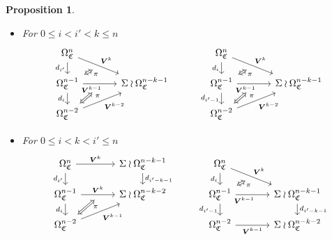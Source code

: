 \documentclass[a4paper,10pt
]{article}%
\numberwithin{equation}{section}
\numberwithin{figure}{section}
\newtheorem{proposition}[equation]{Proposition}%
\theoremstyle{definition} %
\newcommand{\1}{\ensuremath{\mathbbm 1}}%
\begin{document}
\begin{proposition}
\begin{itemize}
		\item[(FF1)]
		For $0 \leq i < i' < k \leq n$
		\begin{equation}
		\begin{tikzcd}[row sep = 12pt, column sep = 35pt]
		\Omega^n_{\mathfrak{C}}
		\arrow{dr}[swap,name=U]{}{\boldsymbol{V}^k} \arrow{d}[swap]{d_{i'}} &
		&
		\Omega^n_{\mathfrak{C}}
		\arrow{dr}[swap,name=UUU]{}{\boldsymbol{V}^k} \arrow{d}[swap]{d_i} &
		\\
		|[alias=V]|
		\Omega^{n-1}_{\mathfrak{C}} \ar{r}[near start,swap]{\boldsymbol{V}^{k-1}}[swap,name=UU]{} \arrow{d}[swap]{d_i}&
		\Sigma \wr \Omega^{n-k-1}_{\mathfrak{C}}
		&
		|[alias=VVV]|
		\Omega^{n-1}_{\mathfrak{C}} \ar{r}[near start, swap]{\boldsymbol{V}^{k-1}}[swap,name=UUUU]{} \ar{d}[swap]{d_{i'-1}} &
		\Sigma \wr \Omega^{n-k-1}_{\mathfrak{C}}
		\\
		|[alias=VV]|
		\Omega^{n-2}_{\mathfrak{C}} \arrow{ur}[swap]{\boldsymbol{V}^{k-2}} &
		&
		|[alias=VVVV]|
		\Omega^{n-2}_{\mathfrak{C}} \arrow{ur}[swap]{\boldsymbol{V}^{k-2}} &
		\arrow[Leftrightarrow, from=V, to=U,shorten >=0.05cm,shorten <=0.05cm
		,swap,near end,"\pi"
		]
		\arrow[Leftrightarrow, from=VV, to=UU,shorten >=0.25cm,shorten <=0.05cm
		,swap,near end,"\pi"
		]
		\arrow[Leftrightarrow, from=VVV, to=UUU,shorten >=0.05cm,shorten <=0.05cm
		,swap,near end,"\pi"
		]
		\arrow[Leftrightarrow, from=VVVV, to=UUUU,shorten >=0.25cm,shorten <=0.05cm
		,swap,near end,"\pi"
		]
		\end{tikzcd}
		\end{equation}
		
		\item[(FF2)]
		For $0 \leq i < k < i' \leq n$
		\begin{equation}
		\begin{tikzcd}[row sep = 12pt, column sep = 35pt]
		\Omega^n_{\mathfrak{C}}
		\arrow{r}[swap,name=U]{}{\boldsymbol{V}^k} \arrow{d}[swap]{d_{i'}} &
		\Sigma \wr \Omega^{n-k-1}_{\mathfrak{C}} \ar{d}{d_{i'-k-1}}
		&
		\Omega^n_{\mathfrak{C}}
		\arrow{dr}[swap,name=UUU]{}{\boldsymbol{V}^k} \arrow{d}[swap]{d_i} &
		\\
		|[alias=V]|
		\Omega^{n-1}_{\mathfrak{C}} \ar{r}{\boldsymbol{V}^{k}}[swap,name=UU]{} \arrow{d}[swap]{d_i}&
		\Sigma \wr \Omega^{n-k-2}_{\mathfrak{C}}
		&
		|[alias=VVV]|
		\Omega^{n-1}_{\mathfrak{C}} \ar{r}[near start, swap]{\boldsymbol{V}^{k-1}}[swap,name=UUUU]{} \ar{d}[swap]{d_{i'-1}} &
		\Sigma \wr \Omega^{n-k-1}_{\mathfrak{C}} \ar{d}{d_{i'-k-1}}
		\\
		|[alias=VV]|
		\Omega^{n-2}_{\mathfrak{C}} \arrow{ur}[swap]{\boldsymbol{V}^{k-1}} &
		&
		|[alias=VVVV]|
		\Omega^{n-2}_{\mathfrak{C}} \ar{r}[swap]{\boldsymbol{V}^{k-1}} &
		\Sigma \wr \Omega^{n-k-2}_{\mathfrak{C}}
		\arrow[Leftrightarrow, from=VV, to=UU,shorten >=0.05cm,shorten <=0.05cm
		,swap,near end,"\pi"
		]
		\arrow[Leftrightarrow, from=VVV, to=UUU,shorten >=0.05cm,shorten <=0.05cm
		,swap,near end,"\pi"
		]
		\end{tikzcd}
		\end{equation}
		

\end{itemize}
\end{proposition}
\end{document}
